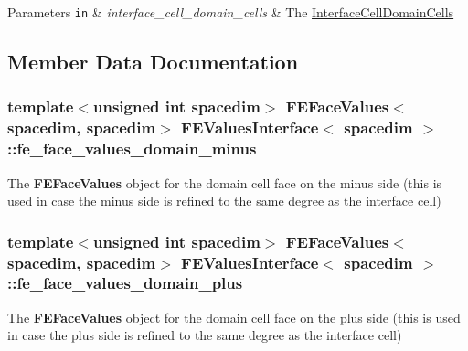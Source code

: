 \begin{DoxyParams}[1]{Parameters}
\mbox{\tt in}  & {\em interface\+\_\+cell\+\_\+domain\+\_\+cells} & The \hyperlink{class_interface_cell_domain_cells}{Interface\+Cell\+Domain\+Cells} \\
\hline
\end{DoxyParams}


\subsection{Member Data Documentation}
\subsubsection[{\texorpdfstring{fe\+\_\+face\+\_\+values\+\_\+domain\+\_\+minus}{fe_face_values_domain_minus}}]{\setlength{\rightskip}{0pt plus 5cm}template$<$unsigned int spacedim$>$ {\bf F\+E\+Face\+Values}$<$spacedim, spacedim$>$ {\bf F\+E\+Values\+Interface}$<$ spacedim $>$\+::fe\+\_\+face\+\_\+values\+\_\+domain\+\_\+minus\hspace{0.3cm}{\ttfamily [private]}}\hypertarget{class_f_e_values_interface_a1ce4354bfe2e852fdc5b7917614404a7}{}\label{class_f_e_values_interface_a1ce4354bfe2e852fdc5b7917614404a7}
The {\bf F\+E\+Face\+Values} object for the domain cell face on the minus side (this is used in case the minus side is refined to the same degree as the interface cell) 
\subsubsection[{\texorpdfstring{fe\+\_\+face\+\_\+values\+\_\+domain\+\_\+plus}{fe_face_values_domain_plus}}]{\setlength{\rightskip}{0pt plus 5cm}template$<$unsigned int spacedim$>$ {\bf F\+E\+Face\+Values}$<$spacedim, spacedim$>$ {\bf F\+E\+Values\+Interface}$<$ spacedim $>$\+::fe\+\_\+face\+\_\+values\+\_\+domain\+\_\+plus\hspace{0.3cm}{\ttfamily [private]}}\hypertarget{class_f_e_values_interface_a6d6820b66a2694d327238c6b3c7fb30c}{}\label{class_f_e_values_interface_a6d6820b66a2694d327238c6b3c7fb30c}
The {\bf F\+E\+Face\+Values} object for the domain cell face on the plus side (this is used in case the plus side is refined to the same degree as the interface cell) 
